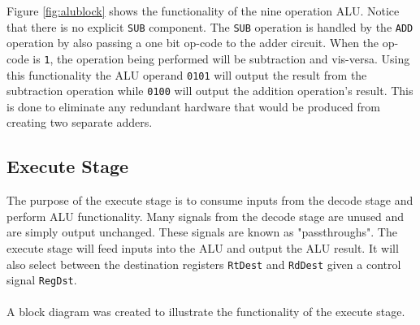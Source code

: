 \documentclass[CMPE]{../KGCOEReport}
\def\code#1{\texttt{#1}}
\begin{document}
    \pagebreak
    
    Figure \ref{fig:alublock} shows the functionality of the nine operation
    ALU. Notice that there is no explicit \code{SUB} component. The \code{SUB}
    operation is handled by the \code{ADD} operation by also passing a one bit
    op-code to the adder circuit. When the op-code is \code{1}, the operation
    being performed will be subtraction and vis-versa. Using this functionality
    the ALU operand \code{0101} will output the result from the subtraction
    operation while \code{0100} will output the addition operation's result.
    This is done to eliminate any redundant hardware that would be produced
    from creating two separate adders.
    
    \pagebreak
    
    \subsection*{Execute Stage}
	
	The purpose of the execute stage is to consume inputs from the decode
	stage and perform ALU functionality. Many signals from the decode stage
	are unused and are simply output unchanged. These signals are known as
	"passthroughs".
	The execute stage will feed inputs into the ALU and output the ALU result.
	It will also select between the destination registers \code{RtDest}
	and \code{RdDest} given a control signal \code{RegDst}.
	\\\\
	A block diagram was created to illustrate the functionality of the execute
	stage.
	
\end{document}

